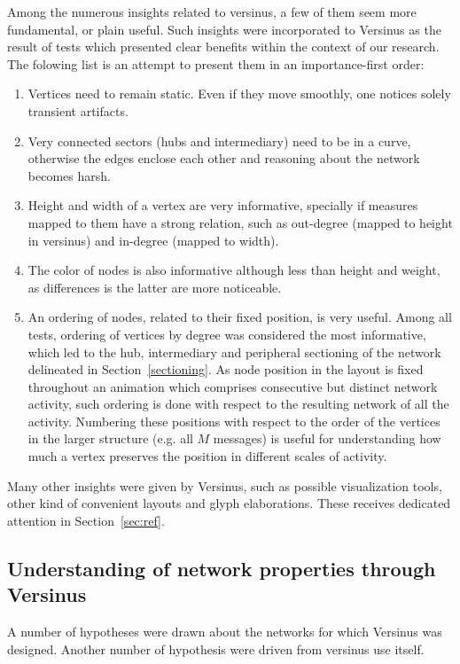 Among the numerous insights related to versinus, a few of them seem more fundamental, or plain useful.
Such insights were incorporated to Versinus as the result of tests which presented clear benefits within the context of our research.
The folowing list is an attempt to present them in an importance-first order:
\begin{enumerate}
	\item Vertices need to remain static.
		Even if they move smoothly, one notices solely transient artifacts.
	\item Very connected sectors (hubs and intermediary) need to be in a curve, otherwise the edges enclose each other and reasoning about the network becomes harsh.
	\item Height and width of a vertex are very informative, specially if measures mapped to them have a strong relation, such as out-degree (mapped to height in versinus) and in-degree (mapped to width).
	\item The color of nodes is also informative although less than height and weight, as differences is the latter are more noticeable.
	\item An ordering of nodes, related to their fixed position, is very useful. Among all tests, ordering of vertices by degree was considered the most informative, which led to the hub, intermediary and peripheral sectioning of the network delineated in Section~\ref{sectioning}.
		As node position in the layout is fixed throughout an animation which comprises consecutive but distinct network activity, such ordering is done with respect to the resulting network of all the activity.
	Numbering these positions with respect to the order of the vertices in the larger structure (e.g. all $M$ messages) is useful for understanding how much a vertex preserves the position in different scales of activity.
\end{enumerate}

Many other insights were given by Versinus, such as possible visualization tools, other kind of convenient layouts and glyph elaborations.
These receives dedicated attention in Section~\ref{sec:ref}.

\subsection{Understanding of network properties through Versinus}
A number of hypotheses were drawn about the networks for which Versinus was designed.
Another number of hypothesis were driven from versinus use itself.

